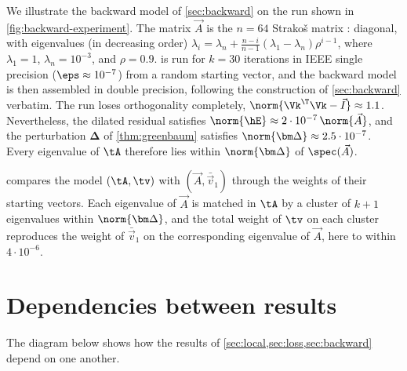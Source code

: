 We illustrate the backward model of \cref{sec:backward} on the run shown in \cref{fig:backward-experiment}.
The matrix \(\vec A\) is the \(n=64\) Strako\v{s} matrix \cite{strakos1991}: diagonal, with eigenvalues (in decreasing order) \(\lambda_i=\lambda_n+\frac{n-i}{n-1}(\lambda_1-\lambda_n)\rho^{i-1}\), where \(\lambda_1=1\), \(\lambda_n=10^{-3}\), and \(\rho=0.9\).
 is run for \(k=30\) iterations in IEEE single precision (\(\eps\approx10^{-7}\)) from a random starting vector, and the backward model is then assembled in double precision, following the construction of \cref{sec:backward} verbatim.
The run loses orthogonality completely, \(\norm{\Vk^\T\Vk-\vec I}\approx1.1\).
Nevertheless, the dilated residual satisfies \(\norm{\hE}\approx2\cdot10^{-7}\,\norm{\vec A}\), and the perturbation \(\bm\Delta\) of \cref{thm:greenbaum} satisfies \(\norm{\bm\Delta}\approx2.5\cdot10^{-7}\).
Every eigenvalue of \(\tA\) therefore lies within \(\norm{\bm\Delta}\) of \(\spec(\vec A)\).

 compares the model \((\tA,\tv)\) with \((\vec A,\bar{\vec v}_1)\) through the weights of their starting vectors.
Each eigenvalue of \(\vec A\) is matched in \(\tA\) by a cluster of \(k+1\) eigenvalues within \(\norm{\bm\Delta}\), and the total weight of \(\tv\) on each cluster reproduces the weight of \(\bar{\vec v}_1\) on the corresponding eigenvalue of \(\vec A\), here to within \(4\cdot10^{-6}\).




\printbibliography

\appendix

\section{Dependencies between results}
\label{sec:dependencies}

The diagram below shows how the results of \cref{sec:local,sec:loss,sec:backward} depend on one another.

